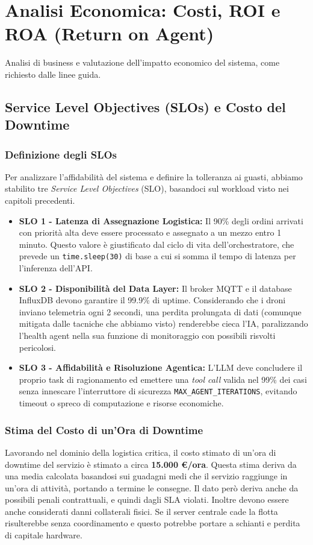 
\chapter{Analisi Economica: Costi, ROI e ROA (Return on Agent)}
\label{cap:analisi_economica}

Analisi di business e valutazione dell'impatto economico del sistema, come richiesto dalle linee guida.

\section{Service Level Objectives (SLOs) e Costo del Downtime}
\label{sec:slo_downtime}
\subsection*{Definizione degli SLOs}
Per analizzare l'affidabilità del sistema e definire la tolleranza ai guasti, abbiamo stabilito tre \textit{Service Level Objectives} (SLO), basandoci sul workload visto nei capitoli precedenti. 
\begin{itemize}
    \item \textbf{SLO 1 - Latenza di Assegnazione Logistica:} Il 90\% degli ordini arrivati con priorità alta deve essere processato e assegnato a un mezzo entro 1 minuto. Questo valore è giustificato dal ciclo di vita dell'orchestratore, che prevede un \texttt{time.sleep(30)} di base a cui si somma il tempo di latenza per l'inferenza dell'API.
    \item \textbf{SLO 2 - Disponibilità del Data Layer:} Il broker MQTT e il database InfluxDB devono garantire il 99.9\% di uptime. Considerando che i droni inviano telemetria ogni 2 secondi, una perdita prolungata di dati (comunque mitigata dalle tacniche che abbiamo visto) renderebbe cieca l'IA, paralizzando l'health agent nella sua funzione di monitoraggio con possibili risvolti pericolosi.
    \item \textbf{SLO 3 - Affidabilità e Risoluzione Agentica:} L'LLM deve concludere il proprio task di ragionamento ed emettere una \textit{tool call} valida nel 99\% dei casi senza innescare l'interruttore di sicurezza \texttt{MAX\_AGENT\_ITERATIONS}, evitando timeout o spreco di computazione e risorse economiche.
\end{itemize}
\subsection*{Stima del Costo di un'Ora di Downtime}
Lavorando nel dominio della logistica critica, il costo stimato di un'ora di downtime del servizio è stimato a circa \textbf{15.000 €/ora}. Questa stima deriva da una media calcolata basandosi sui guadagni medi che il servizio raggiunge in un'ora di attività, portando a termine le consegne. Il dato però deriva anche da possibili penali contrattuali, e quindi dagli SLA violati. Inoltre devono essere anche considerati danni collaterali fisici. Se il server centrale cade la flotta risulterebbe senza coordinamento e questo potrebbe portare a schianti e perdita di capitale hardware.

